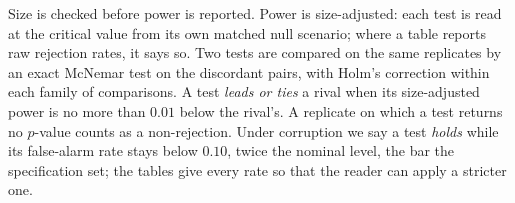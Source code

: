 Size is checked before power is reported. Power is size-adjusted: each test is read at the critical
value from its own matched null scenario; where a table reports raw rejection rates, it says so. Two
tests are compared on the same replicates by an exact McNemar test on the discordant pairs, with Holm's
correction within each family of comparisons. A test \emph{leads or ties} a rival when its
size-adjusted power is no more than $0.01$ below the rival's. A replicate on which a test returns no
$p$-value counts as a non-rejection. Under corruption we say a test \emph{holds} while its false-alarm
rate stays below $0.10$, twice the nominal level, the bar the specification set; the tables give every
rate so that the reader can apply a stricter one.
